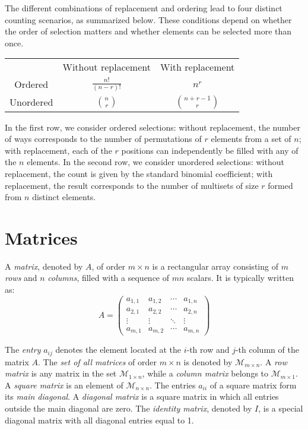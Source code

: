 The different combinations of replacement and ordering lead to four distinct counting scenarios, as summarized below. These conditions depend on whether the order of selection matters and whether elements can be selected more than once.
\begin{center}
\begin{tabular}{ c c c }
& Without replacement & With replacement \\
Ordered    & $\frac{n!}{(n-r)!}$ & $n^r$ \\
Unordered  & $\binom{n}{r}$      & $\binom{n+r-1}{r}$
\end{tabular}
\end{center}
In the first row, we consider ordered selections: without replacement, the number of ways corresponds to the number of permutations of $r$ elements from a set of $n$; with replacement, each of the $r$ positions can independently be filled with any of the $n$ elements. In the second row, we consider unordered selections: without replacement, the count is given by the standard binomial coefficient; with replacement, the result corresponds to the number of multisets of size $r$ formed from $n$ distinct elements.

%
%

\section{Matrices}

A \emph{matrix}, denoted by $A$, of order $m \times n$ is a rectangular array consisting of $m$ \emph{rows} and $n$ \emph{columns}, filled with a sequence of $mn$ scalars. It is typically written as:
\[
A = 
 \begin{pmatrix}
  a_{1,1} & a_{1,2} & \cdots & a_{1,n} \\
  a_{2,1} & a_{2,2} & \cdots & a_{2,n} \\
  \vdots  & \vdots  & \ddots & \vdots  \\
  a_{m,1} & a_{m,2} & \cdots & a_{m,n} 
 \end{pmatrix}
\]

The \emph{entry} $a_{ij}$ denotes the element located at the $i$-th row and $j$-th column of the matrix $A$. The \emph{set of all matrices} of order $m \times n$ is denoted by $\mathcal{M}_{m \times n}$. A \emph{row matrix} is any matrix in the set $\mathcal{M}_{1 \times n}$, while a \emph{column matrix} belongs to $\mathcal{M}_{m \times 1}$. A \emph{square matrix} is an element of $\mathcal{M}_{n \times n}$. The entries $a_{ii}$ of a square matrix form its \emph{main diagonal}. A \emph{diagonal matrix} is a square matrix in which all entries outside the main diagonal are zero. The \emph{identity matrix}, denoted by $I$, is a special diagonal matrix with all diagonal entries equal to 1.


